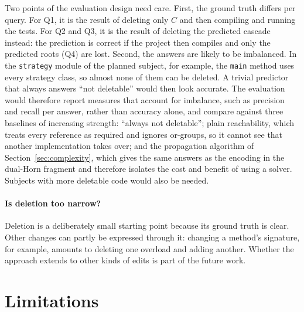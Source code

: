 \documentclass[11pt,a4paper]{article}
\newcommand{\code}[1]{\texttt{#1}}
\begin{document}
Two points of the evaluation design need care. First, the ground truth
differs per query. For Q1, it is the result of deleting only $C$ and then
compiling and running the tests. For Q2 and Q3, it is the result of
deleting the predicted cascade instead: the prediction is correct if the
project then compiles and only the predicted roots (Q4) are lost.
Second, the answers are likely to be imbalanced. In the
\code{strategy} module of the planned subject, for example, the
\code{main} method uses every strategy class, so almost none of them can
be deleted. A trivial
predictor that always answers ``not deletable'' would then look
accurate. The evaluation would therefore report measures that account
for imbalance, such as precision and recall per answer, rather than
accuracy alone, and compare against three baselines of increasing
strength: ``always not deletable''; plain reachability, which treats every
reference as required and ignores or-groups, so it cannot see that
another implementation takes over; and the propagation algorithm of
Section~\ref{sec:complexity}, which gives the same answers as the
encoding in the dual-Horn fragment and therefore isolates the cost and
benefit of using a solver. Subjects with more deletable code would also
be needed.

\paragraph{Is deletion too narrow?}
Deletion is a deliberately small starting point because its ground truth
is clear. Other changes can partly be expressed through it: changing a
method's signature, for example, amounts to deleting one overload and
adding another. Whether the approach extends to other kinds of edits is
part of the future work.

\section{Limitations}\label{sec:limitations}
\end{document}
